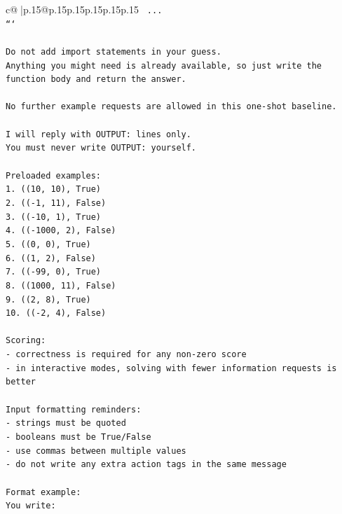 \documentclass{article}
\begin{document}
{\begin{supertabular}{c@{$\;$}|p{.15\linewidth}@{}p{.15\linewidth}p{.15\linewidth}p{.15\linewidth}p{.15\linewidth}p{.15\linewidth}}
{{{\texttt{    ...} \\
\texttt{```} \\
\\ 
\texttt{Do not add import statements in your guess.} \\
\texttt{Anything you might need is already available, so just write the function body and return the answer.} \\
\\ 
\texttt{No further example requests are allowed in this one{-}shot baseline.} \\
\\ 
\texttt{I will reply with OUTPUT: lines only.} \\
\texttt{You must never write OUTPUT: yourself.} \\
\\ 
\texttt{Preloaded examples:} \\
\texttt{1. ((10, 10), True)} \\
\texttt{2. (({-}1, 11), False)} \\
\texttt{3. (({-}10, 1), True)} \\
\texttt{4. (({-}1000, 2), False)} \\
\texttt{5. ((0, 0), True)} \\
\texttt{6. ((1, 2), False)} \\
\texttt{7. (({-}99, 0), True)} \\
\texttt{8. ((1000, 11), False)} \\
\texttt{9. ((2, 8), True)} \\
\texttt{10. (({-}2, 4), False)} \\
\\ 
\texttt{Scoring:} \\
\texttt{{-} correctness is required for any non{-}zero score} \\
\texttt{{-} in interactive modes, solving with fewer information requests is better} \\
\\ 
\texttt{Input formatting reminders:} \\
\texttt{{-} strings must be quoted} \\
\texttt{{-} booleans must be True/False} \\
\texttt{{-} use commas between multiple values} \\
\texttt{{-} do not write any extra action tags in the same message} \\
\\ 
\texttt{Format example:} \\
\texttt{You write:} \\
}}}
\end{supertabular}}
\end{document}
